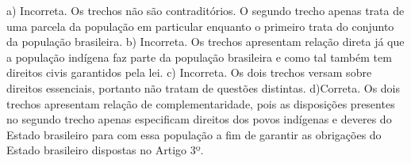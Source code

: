 \begin{enumerate}
a) Incorreta. Os trechos não são contraditórios. O segundo trecho
apenas trata de uma parcela da população em particular enquanto o
primeiro trata do conjunto da população brasileira.
b) Incorreta. Os trechos apresentam relação direta já que a
população indígena faz parte da população brasileira e como tal também
tem direitos civis garantidos pela lei.
c) Incorreta. Os dois trechos versam sobre direitos essenciais, portanto
não tratam de questões distintas.
d)Correta. Os dois trechos apresentam relação de complementaridade, pois
as disposições presentes no segundo trecho apenas especificam direitos
dos povos indígenas e deveres do Estado brasileiro para com essa
população a fim de garantir as obrigações do Estado brasileiro dispostas
no Artigo 3º.

\end{enumerate}


